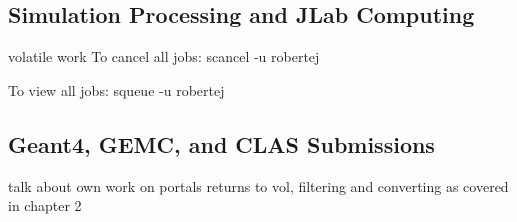     \subsection{Simulation Processing and JLab Computing}
        volatile work
            To cancel all jobs:
        scancel -u robertej
        
        To view all jobs:
        squeue -u robertej
        
    \subsection{Geant4, GEMC, and CLAS Submissions}
    
        talk about own work on portals
        returns to vol, filtering and converting as covered in chapter 2
